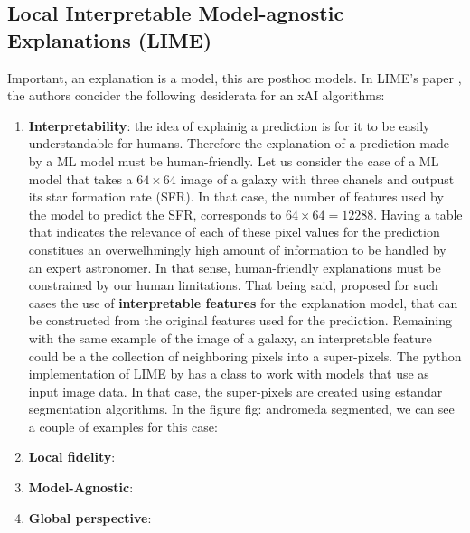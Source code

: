 \subsection{Local Interpretable Model-agnostic Explanations (LIME)}


Important, an explanation is a model, this are posthoc models.
In LIME's paper \citep{ribeiro2016}, the authors concider the following desiderata for an xAI algorithms:
\begin{enumerate}

  \item \textbf{Interpretability}: the idea of explainig a prediction is for it to be easily understandable for humans. Therefore the explanation of a prediction made by a ML model must be human-friendly. Let us consider the case of a ML model that takes a $64 \times 64$ image of a galaxy with three chanels and outpust its star formation rate (SFR). In that case, the number of features used by the model to predict the SFR, corresponds to $64 \times 64 = 12288$. Having a table that indicates the relevance of each of these pixel values for the prediction constitues an overwelhmingly high amount of information to be handled by an expert astronomer. In that sense, human-friendly explanations must be constrained by our human limitations. That being said, \cite{ribeiro2016} proposed for such cases the use of \textbf{interpretable features} for the explanation model, that can be constructed from the original features used for the prediction. Remaining with the same example of the image of a galaxy, an interpretable feature could be a the collection of neighboring pixels into a super-pixels. The python implementation of LIME by \cite{ribeiro2016} has a class to work with models that use as input image data. In that case, the super-pixels are created using estandar segmentation algorithms. In the figure {fig: andromeda segmented}, we can see a couple of examples for this case:

  \item \textbf{Local fidelity}:

  \item \textbf{Model-Agnostic}:

  \item \textbf{Global perspective}:

\end{enumerate}

